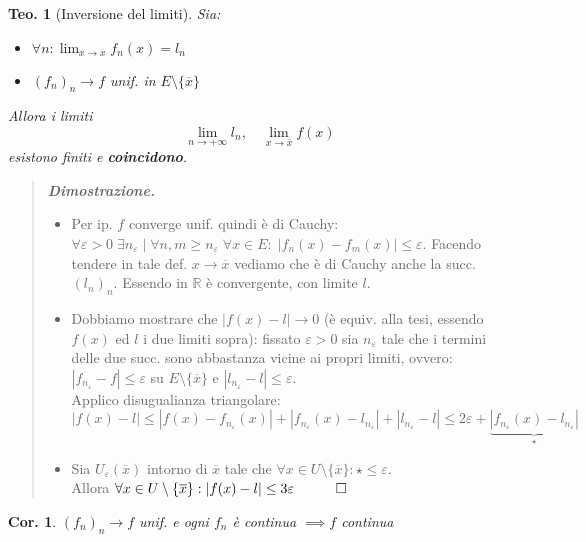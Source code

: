 \documentclass[a4paper,10pt]{article}
\newcommand{\re}{\mathbb{R}} %
\theoremstyle{indentdefinition}
\theoremstyle{indenttheorem}
\newtheorem{thm}{Teo.}
\newtheorem{cor}{Cor.}
\theoremstyle{myremark}
\theoremstyle{indentgeneral}
\newenvironment{dimo}{\begin{quote}\textit{\textbf{Dimostrazione.}}}{\end{quote}} %
\begin{document}
\begin{thm}[Inversione del limiti]
    Sia:
    \begin{itemize}
        \item $\forall n: \lim_{x\to\overline{x}}f_n(x)=l_n$
        \item $(f_n)_n \to f$  unif. in $E\setminus \{\overline{x}\}$
    \end{itemize}
    Allora i limiti
    $$\lim_{n\to+\infty}l_n, \quad \lim_{x\to\overline{x}}f(x)$$
    esistono finiti e \textbf{coincidono}.
\end{thm}
\begin{dimo}
    \begin{itemize}
        \item Per ip. $f$ converge unif. quindi è di Cauchy: $\forall \varepsilon>0 \;\exists n_\varepsilon \mid \forall n,m\ge n_\varepsilon \; \forall x \in E: \; |f_n(x)-f_m(x)|\le \varepsilon$. Facendo tendere in tale def. $x\to\overline{x}$ vediamo che è di Cauchy anche la succ. $(l_n)_n$. Essendo in $\re$ è convergente, con limite $l$.
        \item Dobbiamo mostrare che $|f(x)-l|\to 0$ (è equiv. alla tesi, essendo $f(x)$ ed $l$ i due limiti sopra): fissato $\varepsilon>0$ sia $n_\varepsilon$ tale che  i termini delle due succ. sono abbastanza vicine ai propri limiti, ovvero:
        $|f_{n_\varepsilon}-f|\le \varepsilon$ su $E\setminus\{\overline{x}\}$ e  $|l_{n_\varepsilon}-l|\le \varepsilon$. \\
        Applico disugualianza triangolare:
        $$|f(x)-l|\le |f(x)-f_{n_\varepsilon}(x)|+|f_{n_\varepsilon}(x)-l_{n_\varepsilon}|+|l_{n_\varepsilon}-l|\le 2\varepsilon+\underbrace{|f_{n_\varepsilon}(x)-l_{n_\varepsilon}|}_\star$$
        \item Sia $U_\varepsilon(\overline{x})$ intorno di $\overline{x}$ tale che $\forall x \in U\setminus\{\overline{x}\}: \star \le \varepsilon$. \\
        Allora $\forall x \in U\setminus\{\overline{x}\}: |f(x)-l|\le 3\varepsilon \quad \qed$
    \end{itemize}
\end{dimo}

\begin{cor}
    $(f_n)_n\to f$ unif. e ogni $f_n$ è continua $\implies f$ continua 
\end{cor}
\end{document}
